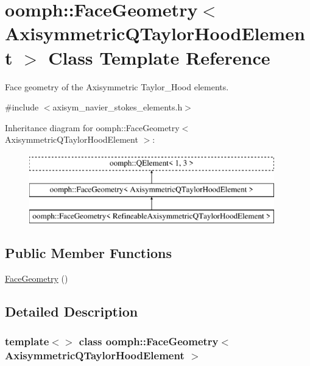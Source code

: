 \hypertarget{classoomph_1_1FaceGeometry_3_01AxisymmetricQTaylorHoodElement_01_4}{}\section{oomph\+:\+:Face\+Geometry$<$ Axisymmetric\+Q\+Taylor\+Hood\+Element $>$ Class Template Reference}
\label{classoomph_1_1FaceGeometry_3_01AxisymmetricQTaylorHoodElement_01_4}


Face geometry of the Axisymmetric Taylor\+\_\+\+Hood elements.  




{\ttfamily \#include $<$axisym\+\_\+navier\+\_\+stokes\+\_\+elements.\+h$>$}

Inheritance diagram for oomph\+:\+:Face\+Geometry$<$ Axisymmetric\+Q\+Taylor\+Hood\+Element $>$\+:\begin{figure}[H]
\begin{center}
\leavevmode
\includegraphics[height=3.000000cm]{classoomph_1_1FaceGeometry_3_01AxisymmetricQTaylorHoodElement_01_4}
\end{center}
\end{figure}
\subsection*{Public Member Functions}
\begin{DoxyCompactItemize}
\item 
\hyperlink{classoomph_1_1FaceGeometry_3_01AxisymmetricQTaylorHoodElement_01_4_ac2c2aa1d350727d95fde8d188f96aae1}{Face\+Geometry} ()
\end{DoxyCompactItemize}


\subsection{Detailed Description}
\subsubsection*{template$<$$>$\newline
class oomph\+::\+Face\+Geometry$<$ Axisymmetric\+Q\+Taylor\+Hood\+Element $>$}

